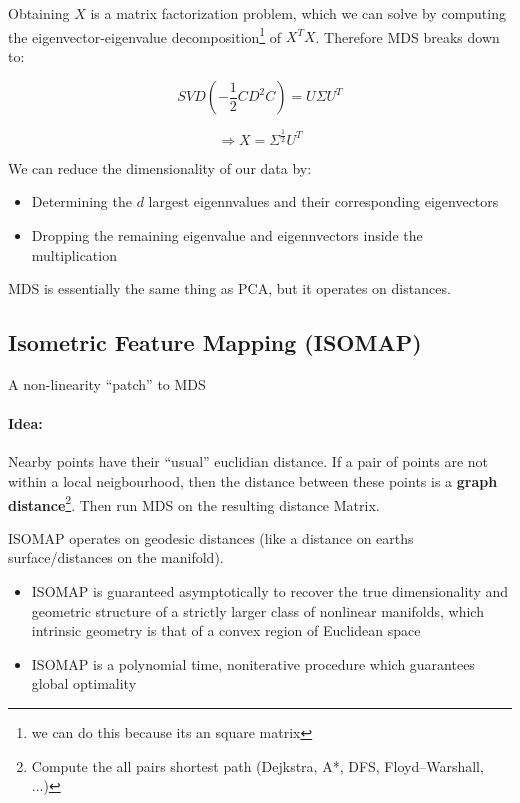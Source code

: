 Obtaining $X$ is a matrix factorization problem, which we can solve by computing the eigenvector-eigenvalue decomposition\footnote{we can do this because its an square matrix} of \(X^T X\). Therefore MDS breaks down to:

\[ \boxed{SVD(-\frac{1}{2} C D^2 C) = U \Sigma U^T}\]

\[ \Rightarrow X = \Sigma^{\frac{1}{2}} U^T \]

We can reduce the dimensionality of our data by:
\begin{itemize}
    \item Determining the \(d\) largest eigennvalues and their corresponding eigenvectors
    \item Dropping the remaining eigenvalue and eigennvectors inside the multiplication
\end{itemize}

MDS is essentially the same thing as PCA, but it operates on distances.


\subsection*{Isometric Feature Mapping (ISOMAP)}
A non-linearity ``patch'' to MDS

\paragraph{Idea:} Nearby points have their ``usual'' euclidian distance. If a pair of points are not within a local neigbourhood, then the distance between these points is a \textbf{graph distance}\footnote{Compute the all pairs shortest path (Dejkstra, A*,  DFS, Floyd–Warshall, ...)}. Then run MDS on the resulting distance Matrix.

ISOMAP operates on geodesic distances (like a distance on earths surface/distances on the manifold).

\begin{itemize}
	\item ISOMAP is guaranteed asymptotically to recover the true dimensionality and geometric structure of a strictly larger class of nonlinear manifolds, which intrinsic geometry is that of a convex region of Euclidean space
	\item ISOMAP is a polynomial time, noniterative procedure which guarantees global optimality
\end{itemize}
